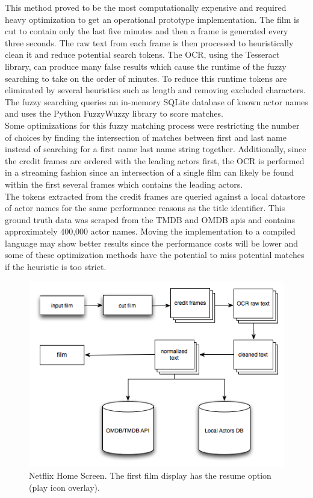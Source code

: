 \documentclass[paper=a4, fontsize=11pt]{scrartcl} %
\numberwithin{equation}{section} %
\numberwithin{figure}{section} %
\numberwithin{table}{section} %
\begin{document}
This method proved to be the most computationally expensive and required heavy optimization to get an operational prototype implementation. The film is cut to contain only the last five minutes and then a frame is generated every three seconds. The raw text from each frame is then processed to heuristically clean it and reduce potential search tokens. The OCR, using the Tesseract library, can produce many false results which cause the runtime of the fuzzy searching to take on the order of minutes. To reduce this runtime tokens are eliminated by several heuristics such as length and removing excluded characters. The fuzzy searching queries an in-memory SQLite database of known actor names and uses the Python FuzzyWuzzy library to score matches. \\

Some optimizations for this fuzzy matching process were restricting the number of choices by finding the intersection of matches between first and last name instead of searching for a first name last name string together. Additionally, since the credit frames are ordered with the leading actors first, the OCR is performed in a streaming fashion since an intersection of a single film can likely be found within the first several frames which contains the leading actors. \\

The tokens extracted from the credit frames are queried against a local datastore of actor names for the same performance reasons as the title identifier. This ground truth data was scraped from the TMDB and OMDB apis and contains approximately 400,000 actor names. Moving the implementation to a compiled language may show better results since the performance costs will be lower and some of these optimization methods have the potential to miss potential matches if the heuristic is too strict. \\

\begin{figure}[H]
\center\includegraphics[scale=0.75]{credit-identifier.png}
\caption{Netflix Home Screen. The first film display has the resume option (play icon overlay).}
\label{fig:credit-identifier}
\end{figure}
\end{document}
